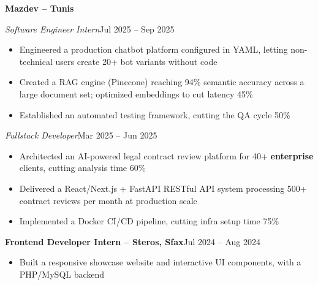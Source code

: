 \documentclass[10pt,a4paper]{article}
\newcommand{\entry}[2]{\vspace{1pt}\noindent\textbf{#1}\hfill{\color{muted}#2}\par}
\newcommand{\subentry}[2]{\noindent\textit{#1}\hfill{\color{muted}#2}\par}
\begin{document}
\entry{Mazdev -- Tunis}{}
\subentry{Software Engineer Intern}{Jul 2025 -- Sep 2025}
\begin{itemize}
  \item Engineered a production chatbot platform configured in YAML, letting non-technical users create 20+ bot variants without code
  \item Created a RAG engine (Pinecone) reaching 94\% semantic accuracy across a large document set; optimized embeddings to cut latency 45\%
  \item Established an automated testing framework, cutting the QA cycle 50\%
\end{itemize}
\subentry{Fullstack Developer}{Mar 2025 -- Jun 2025}
\begin{itemize}
  \item Architected an AI-powered legal contract review platform for 40+ \textbf{enterprise} clients, cutting analysis time 60\%
  \item Delivered a React/Next.js + FastAPI RESTful API system processing 500+ contract reviews per month at production scale
  \item Implemented a Docker CI/CD pipeline, cutting infra setup time 75\%
\end{itemize}

\entry{Frontend Developer Intern -- Steros, Sfax}{Jul 2024 -- Aug 2024}
\begin{itemize}
  \item Built a responsive showcase website and interactive UI components, with a PHP/MySQL backend
\end{itemize}
\end{document}
